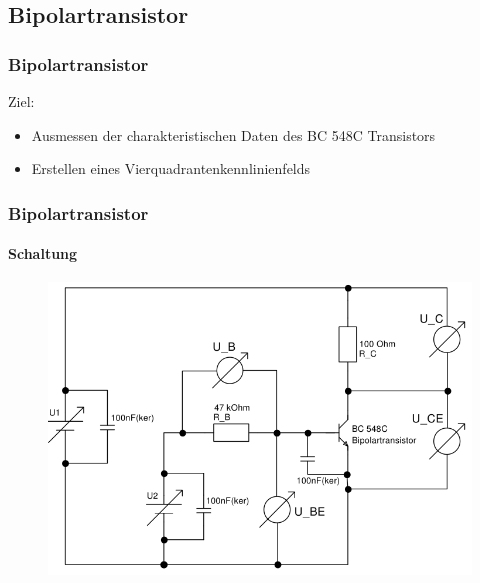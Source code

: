 \subsection{Bipolartransistor} %
\label{sub:Bipolartransistor}
\begin{frame}
    \frametitle{Bipolartransistor}
    \begin{block}{Ziel:}
         \begin{itemize}
             \item Ausmessen der charakteristischen Daten des BC 548C
             Transistors
             \item Erstellen eines Vierquadrantenkennlinienfelds
         \end{itemize}
    \end{block}
\end{frame}
\begin{frame}
    \frametitle{Bipolartransistor}
    \framesubtitle{Schaltung}
    \begin{figure}[H]
    \begin{center}
            \includegraphics[scale=0.35]{./img/schaltungen/bipolarschaltung.png}
    \end{center}
    \end{figure}
\end{frame}
